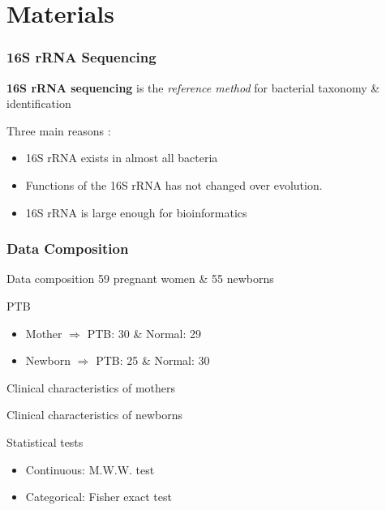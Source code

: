\documentclass{beamer}
\begin{document}
    \section{Materials}
    \begin{frame}
        \frametitle{16S rRNA Sequencing}

        \textbf{16S rRNA sequencing} is the \textit{reference method} for bacterial taxonomy \& identification \cite{16S1}

        Three main reasons \cite{16S2}:
        \begin{itemize}
            \item 16S rRNA exists in almost all bacteria
            \item Functions of the 16S rRNA has not changed over evolution.
            \item 16S rRNA is large enough for bioinformatics
        \end{itemize}
    \end{frame}

    \begin{frame}[allowframebreaks]
        \frametitle{Data Composition}

        \begin{block}{Data composition}
            59 pregnant women \& 55 newborns
        \end{block}

        \begin{block}{PTB}
            \begin{itemize}
                \item Mother $\Rightarrow$ PTB: 30 \& Normal: 29
                \item Newborn $\Rightarrow$ PTB: 25 \& Normal: 30
            \end{itemize}
        \end{block}
        \pagebreak

        \begin{table}
            \centering
            \caption{Clinical characteristics of mothers}
            \resizebox{!}{\ifdimcomp{\height}{<}{0.35 \textheight}{\height}{0.35 \textheight}}
            {}
        \end{table}

        \begin{table}
            \centering
            \caption{Clinical characteristics of newborns}
            \resizebox{!}{\ifdimcomp{\height}{<}{0.25 \textheight}{\height}{0.25 \textheight}}
            {}
        \end{table}

        \begin{exampleblock}{Statistical tests}
            \begin{itemize}
                \item Continuous: M.W.W. test
                \item Categorical: Fisher exact test
            \end{itemize}
        \end{exampleblock}
    \end{frame}
\end{document}
